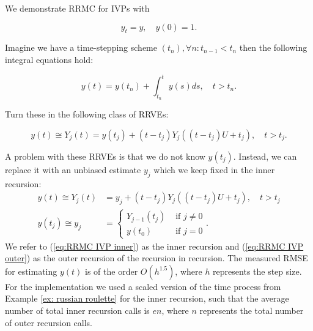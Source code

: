 \documentclass[a4paper,12pt]{article}
\begin{document}
\begin{example}[RRMC $y_t=y$] \label{ex:RRMC IVP}
    We demonstrate RRMC for IVPs with

    \begin{equation}
        y_t = y, \quad y(0) = 1.
    \end{equation}

    Imagine we have a time-stepping scheme $(t_{n}), \forall n: t_{n-1} < t_{n}$
    then the following integral equations hold:

    \begin{equation}
        y(t)= y(t_{n}) + \int_{t_{n}}^{t}y(s)ds , \quad t>t_{n}.
    \end{equation}

    Turn these in the following class of RRVEs:

    \begin{equation}
        y(t) \cong Y_{j}(t) = y(t_{j}) + (t-t_{j})Y_{j}((t-t_{j})U+t_{j}), \quad t>t_{j}.
    \end{equation}

    A problem with these RRVEs is that we do not know $y(t_{j})$.
    Instead, we can replace it with an unbiased estimate $y_{j}$
    which we keep fixed in the inner recursion:
    \begin{align}
        \label{eq:RRMC IVP inner}
        y(t) \cong Y_{j}(t)  & = y_{j} + (t-t_{j})Y_{j}((t-t_{j})U+t_{j}), \quad t>t_{j} \\
        y(t_{j}) \cong y_{j} & = \begin{cases}
                                     Y_{j-1}(t_{j}) & \text{ if } j \neq 0 \\
                                     y(t_{0})       & \text{ if } j = 0
                                 \end{cases}.
        \label{eq:RRMC IVP outer}
    \end{align}
    We refer to (\ref{eq:RRMC IVP inner}) as the inner recursion and
    (\ref{eq:RRMC IVP outer}) as the outer recursion of the recursion in
    recursion.
    The measured RMSE for estimating $y(t)$ is of the order
    $O\left(h^{1.5} \right)$, where $h$ represents
    the step size. For the implementation we used a scaled version
    of the time process from Example \ref{ex: russian roulette}
    for the inner recursion, such that the average number of total inner recursion calls
    is $e n$, where $n$ represents the total number of outer recursion calls.
\end{example}
\end{document}
